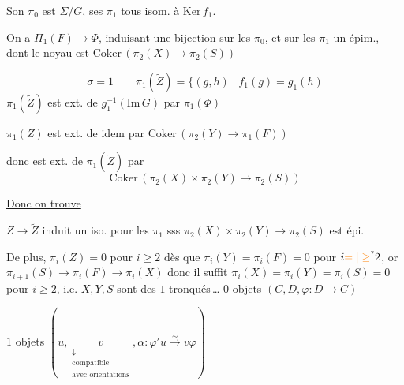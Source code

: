 Son $\pi_0$ est $\Sigma/G$, ses $\pi_1$ tous isom. à $\mathrm{Ker}\,f_1$.

On a $\Pi_1(F)\longrightarrow\Phi$, induisant une bijection sur les $\pi_0$, et sur les $\pi_1$ un épim., dont le noyau est $\mathrm{Coker}\,(\pi_2(X)\to\pi_2(S))$

\[
\sigma=1\qquad \pi_1(\widetilde Z)=\{(g,h)\mid f_1(g)=g_1(h)
\]
$\pi_1(\widetilde Z)$ est ext. de $g_1^{-1}(\mathrm{Im}\,G)$ par $\pi_1(\Phi)$

$\pi_1(Z)$ est ext. de idem par $\mathrm{Coker}\,(\pi_2(Y)\to\pi_1(F))$

donc est ext. de $\pi_1(\widetilde Z)$ par
\[
\mathrm{Coker}\,(\pi_2(X)\times\pi_2(Y)\to\pi_2(S))
\]

\uline{Donc on trouve}

$Z\longrightarrow\widetilde Z$ induit un iso. pour les $\pi_1$ sss $\pi_2(X)\times\pi_2(Y)\longrightarrow\pi_2(S)$ est épi.

De plus, $\pi_i(Z)=0$ pour $i\geq 2$  dès que $\pi_i(Y)=\pi_i(F)=0$ pour $i\unsure{=|\geq}2$, or $\pi_{i+1}(S)\to\pi_i(F)\to\pi_i(X)$ donc il suffit $\pi_i(X)=\pi_i(Y)=\pi_i(S)=0$ pour $i\geq 2$, i.e. $X,Y,S$ sont des $1$-tronqués\,\ldots
$0$-objets \qquad $(C,D,\varphi:D\to C)$

$1$ objets \qquad $(u,\underset{\substack{\downarrow\\\text{compatible}\\\text{avec orientations}}}{v},\alpha:\varphi'u\xrightarrow{\sim}v\varphi)$


